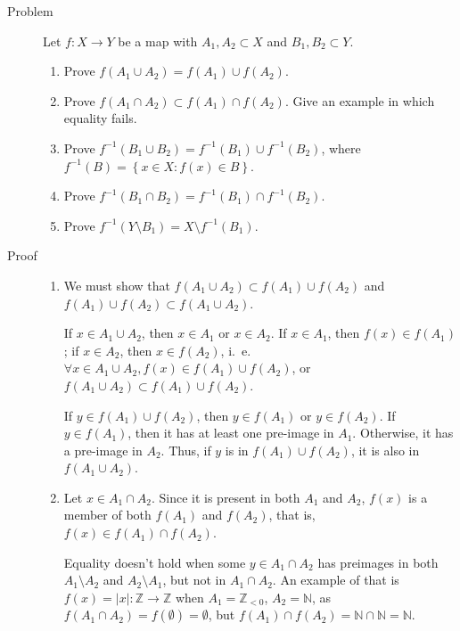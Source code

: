 \begin{description}
\item[Problem] Let $f : X \rightarrow Y$ be a map with $A_1, A_2 \subset X$ and
$B_1, B_2 \subset Y$.
\begin{enumerate}
\item Prove $f(A_1 \cup A_2) = f(A_1) \cup f(A_2)$.
\item Prove $f(A_1 \cap A_2) \subset f(A_1) \cap f(A_2)$. Give an example in
which equality fails.
\item Prove $f^{-1}(B_1 \cup B_2) = f^{-1} (B_1) \cup f^{-1} (B_2)$, where
$f^{-1}(B) = \left\{x \in X : f(x) \in B\right\}$.
\item Prove $f^{-1} (B_1 \cap B_2) = f^{-1}(B_1) \cap f^{-1} (B_2)$.
\item Prove $f^{-1} (Y \setminus B_1) = X \setminus f^{-1} (B_1)$.
\end{enumerate}

\item[Proof]
        \begin{enumerate}
                \item We must show that $f(A_1 \cup A_2) \subset f(A_1) \cup
                        f(A_2)$ and $f(A_1) \cup f(A_2) \subset f(A_1 \cup
                        A_2)$.

                        If $x \in A_1 \cup A_2$, then $x \in A_1$ or
                        $x \in A_2$. If $x \in A_1$, then $f(x) \in f(A_1)$;
                        if $x \in A_2$, then $x \in f(A_2)$, i.\ e. $\forall x
                        \in A_1 \cup A_2, f(x) \in f(A_1) \cup f(A_2)$, or
                        $f(A_1 \cup A_2) \subset f(A_1) \cup f(A_2)$.

                        If $y \in f(A_1) \cup f(A_2)$, then $y \in f(A_1)$ or
                        $y \in f(A_2)$. If $y \in f(A_1)$, then it has at least
                        one pre-image in $A_1$. Otherwise, it has a pre-image
                        in $A_2$. Thus, if $y$ is in $f(A_1) \cup f(A_2)$, it
                        is also in $f(A_1 \cup A_2)$.

                \item Let $x \in A_1 \cap A_2$. Since it is present in both
                        $A_1$ and $A_2$, $f(x)$ is a member of both $f(A_1)$
                        and $f(A_2)$, that is, $f(x) \in f(A_1) \cap f(A_2)$.

                        Equality doesn't hold when some $y \in A_1 \cap A_2$
                        has preimages in both $A_1 \setminus A_2$ and $A_2
                        \setminus A_1$, but not in $A_1 \cap A_2$. An example
                        of that is $f(x) = |x| : \mathbb{Z} \rightarrow
                        \mathbb{Z}$ when $A_1 = \mathbb{Z}_{< 0}$, $A_2 =
                        \mathbb{N}$, as $f(A_1 \cap A_2) = f(\emptyset) =
                        \emptyset$, but $f(A_1) \cap f(A_2) = \mathbb{N} \cap
                        \mathbb{N} = \mathbb{N}$.

        \end{enumerate}
\end{description}
